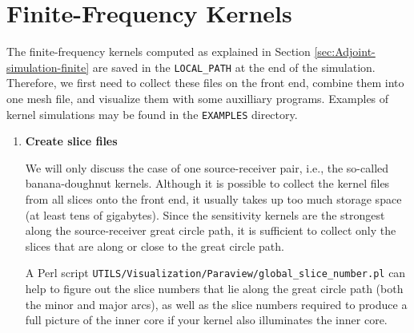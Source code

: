 \documentclass[oneside,english]{book}
\newenvironment{lyxcode}
{\begin{list}{}{
\setlength{\rightmargin}{\leftmargin}
\setlength{\listparindent}{0pt}%
\raggedright
\setlength{\itemsep}{0pt}
\setlength{\parsep}{0pt}
\normalfont\ttfamily}%
 \item[]}
{\end{list}}
\begin{document}
\section{\label{sec:Finite-Frequency-Kernels}Finite-Frequency Kernels}

The finite-frequency kernels computed as explained in Section \ref{sec:Adjoint-simulation-finite}
are saved in the \texttt{LOCAL\_PATH} at the end of the simulation.
Therefore, we first need to collect these files on the front end,
combine them into one mesh file, and visualize them with some auxilliary
programs. Examples of kernel simulations may be found in the \texttt{EXAMPLES} directory. 

\begin{enumerate}
\item \textbf{Create slice files}


We will only discuss the case of one source-receiver pair, i.e., the
so-called banana-doughnut kernels. Although it is possible to collect
the kernel files from all slices onto the front end, it usually takes
up too much storage space (at least tens of gigabytes). Since the
sensitivity kernels are the strongest along the source-receiver great
circle path, it is sufficient to collect only the slices that are
along or close to the great circle path.

A Perl script \texttt{UTILS/Visualization/Paraview/global\_slice\_number.pl} can
help to figure out the slice numbers that lie along the great circle
path (both the minor and major arcs), as well as the slice numbers
required to produce a full picture of the inner core if your kernel
also illuminates the inner core.

\end{enumerate}
\end{document}

